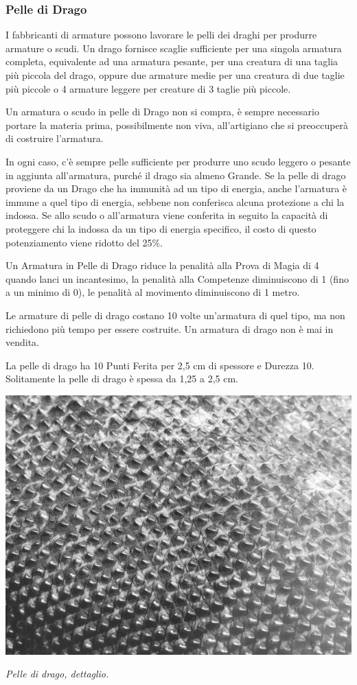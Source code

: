 \begin{multicols}{2}
\subsubsection{Pelle di Drago}

\label{pelle-di-drago}

I fabbricanti di armature possono lavorare le pelli dei draghi per produrre armature o scudi.
Un drago fornisce scaglie sufficiente per una singola armatura completa, equivalente ad una armatura pesante, per una creatura di una taglia più piccola del drago, oppure due armature medie per una creatura di due taglie più piccole o 4 armature leggere per creature di 3 taglie più piccole.

Un armatura o scudo in pelle di Drago non si compra, è sempre necessario portare la materia prima, possibilmente non viva, all'artigiano che si preoccuperà di costruire l'armatura.

In ogni caso, c'è sempre pelle sufficiente per produrre uno scudo leggero o pesante in aggiunta all'armatura, purché il drago sia almeno Grande.
Se la pelle di drago proviene da un Drago che ha immunità ad un tipo di energia, anche l'armatura è immune a quel tipo di energia, sebbene non conferisca alcuna protezione a chi la indossa. Se allo scudo o all'armatura viene conferita in seguito la capacità di proteggere chi la indossa da un tipo di energia specifico, il costo di questo potenziamento viene ridotto del 25\%.

Un Armatura in Pelle di Drago riduce la penalità alla Prova di Magia di 4 quando lanci un  incantesimo, la penalità alla Competenze diminuiscono di 1 (fino a un minimo di 0), le penalità al movimento diminuiscono di 1 metro.

Le armature di pelle di drago costano 10 volte un'armatura di quel tipo, ma non richiedono più tempo per essere costruite. Un armatura di drago non è mai in vendita.

La pelle di drago ha 10 Punti Ferita per 2,5 cm di spessore e Durezza 10. Solitamente la pelle di drago è spessa da 1,25 a 2,5 cm.

\end{multicols}

\vfill

\begin{center}
\includegraphics[width=0.6\linewidth]{immagini/dragonhide.png}

\emph{Pelle di drago, dettaglio.}
\end{center}

\pagebreak

